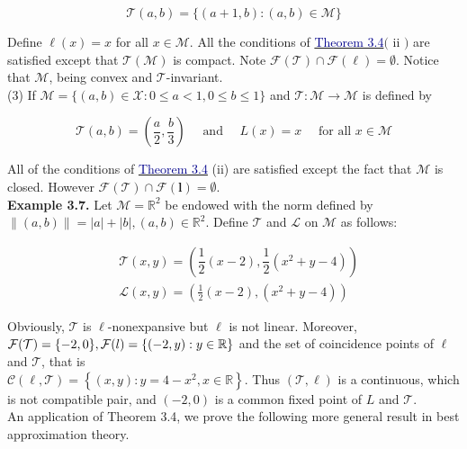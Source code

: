 \documentclass[12pt,a4paper,two side]{article}
\begin{document}
$$
\mathcal{T}(a, b)=\{(a+1, b):(a, b) \in \mathcal{M}\}
$$


Define $\ell(x)=x$ for all $x \in \mathcal{M}$. All the conditions of \hyperlink{muc3.4}{\textcolor{Darkblue}{Theorem 3.4}}$($ ii $)$ are satisfied except that $\mathcal{T}(\mathcal{M})$ is compact. Note $\mathcal{F}(\mathcal{T}) \cap \mathcal{F}(\ell)=\emptyset$. Notice that $\mathcal{M}$, being convex and $\mathcal{T}$-invariant.\\

(3) If $\mathcal{M}=\{(a, b) \in \mathcal{X}: 0 \leq a<1,0 \leq b \leq 1\}$ and $\mathcal{T}: \mathcal{M} \rightarrow \mathcal{M}$ is defined by

$$
\mathcal{T}(a, b)=\left(\frac{a}{2}, \frac{b}{3}\right) \quad \text { and } \quad L(x)=x \quad \text { for all } x \in \mathcal{M}
$$


All of the conditions of \hyperlink{muc3.4}{\textcolor{Darkblue}{Theorem 3.4}} (ii) are satisfied except the fact that $\mathcal{M}$ is closed. However $\mathcal{F}(\mathcal{T}) \cap \mathcal{F}(\boldsymbol{l})=\emptyset$.\\

\textbf{Example 3.7.} Let $\mathcal{M}=\mathbb{R}^2$ be endowed with the norm defined by $\|(a, b)\|=|a|+|b|,(a, b) \in \mathbb{R}^2$. Define $\mathcal{T}$ and $\mathcal{L}$ on $\mathcal{M}$ as follows:

$$
\begin{aligned}
& \mathcal{T}(x, y)=\left(\dfrac{1}{2}(x-2), \dfrac{1}{2}\left(x^2+y-4\right)\right) \\
& \mathscr{L}(x, y)=\left(\frac{1}{2}(x-2),\left(x^2+y-4\right)\right)
\end{aligned}
$$


Obviously, $\mathcal{T}$ is $\ell$-nonexpansive but $\ell$ is not linear. Moreover, $\mathcal{F}(\mathcal{T})=\{-2,0\},\\
\mathcal{F}(l)=\{(-2, y): y \in \mathbb{R}\}$ and the set of coincidence points of $\ell$ and $\mathcal{T}$, that is\\ $\mathcal{C}(\ell, \mathcal{T})=\left\{(x, y): y=4-x^2, x \in \mathbb{R}\right\}$. Thus $(\mathcal{T}, \ell)$ is a continuous, which is not compatible pair, and $(-2,0)$ is a common fixed point of $L$ and $\mathcal{T}$.\\

An application of Theorem 3.4, we prove the following more general result in best approximation theory.\\
\end{document}
